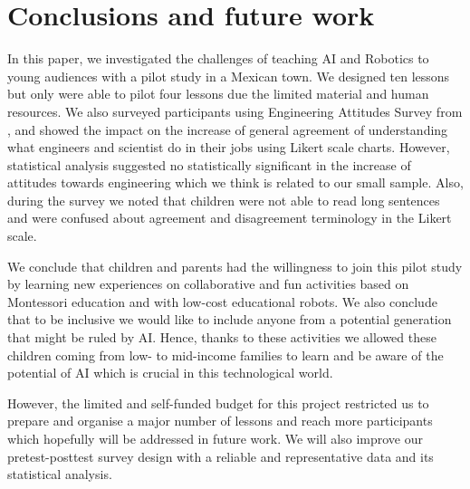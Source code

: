 \documentclass[sigconf]{acmart}
\begin{document}
\section{Conclusions and future work}
In this paper, we investigated the challenges of teaching AI and Robotics to young audiences with a pilot study in a Mexican town.
We designed ten lessons but only were able to pilot four lessons due the limited material and human resources. 
We also surveyed participants using Engineering Attitudes Survey from \cite{cunningham2010impact}, and showed the impact on the increase of general agreement of understanding what engineers and scientist do in their jobs using Likert scale charts.
However, statistical analysis suggested no statistically significant in the increase of attitudes towards
engineering  which we think is related to our small sample. 
Also, during the survey we noted that children were not able to read long sentences and were confused about agreement and disagreement terminology in the Likert scale.

We conclude that children and parents had the willingness to join this pilot study by learning new experiences on collaborative and fun activities
based on Montessori education and with low-cost educational robots. 
We also conclude that to be inclusive we would like to include anyone from a potential generation that might be ruled by AI. 
Hence, thanks to these activities we allowed these children coming from low- to mid-income families to learn and be aware of the potential of AI which is crucial in this technological world.

However, the limited and self-funded budget for this project restricted us to prepare and organise a major number of lessons and reach more participants which hopefully will be addressed in future work. 
We will also improve our pretest-posttest survey design with a reliable and representative data and its statistical analysis.

\end{document}
